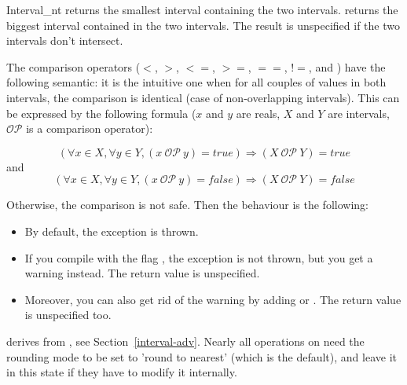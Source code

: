 \begin{ccClass} {Interval_nt}
 {returns the smallest
interval containing the two intervals.}
 {returns the biggest
interval contained in the two intervals.  The result is unspecified if
the two intervals don't intersect.}


The comparison operators ($<$, $>$, $<=$, $>=$, $==$, $!=$, 
and ) have the following semantic: it is the intuitive
one when for all couples of values in both intervals, the comparison
is identical (case of non-overlapping intervals).  This can be expressed
by the following formula ($x$ and $y$ are reals, $X$ and $Y$ are
intervals, $\mathcal{OP}$ is a comparison operator):

$$
\left(\forall x \in X, \forall y \in Y, (x\ \mathcal{OP}\ y) = true\right)
\Rightarrow (X\ \mathcal{OP}\ Y) = true
$$
and
$$
\left(\forall x \in X, \forall y \in Y, (x\ \mathcal{OP}\ y) = false\right)
\Rightarrow (X\ \mathcal{OP}\ Y) =false
$$

Otherwise, the comparison is not safe.  Then the behaviour is the following:
\begin{itemize}
\item By default, the exception
     is thrown.
\item If you compile with the flag , the exception
    is not thrown, but you get a warning instead.
    The return value is unspecified.
\item Moreover, you can also get rid of the warning by adding
     or .
    The return value is unspecified too.
\end{itemize}

\ccImplementation

 derives from , 
see Section~\ref{interval-adv}.  Nearly all operations on
 need the rounding mode to be set to 'round to nearest'
(which is the default),
and leave it in this state if they have to modify it internally.

\end{ccClass}

